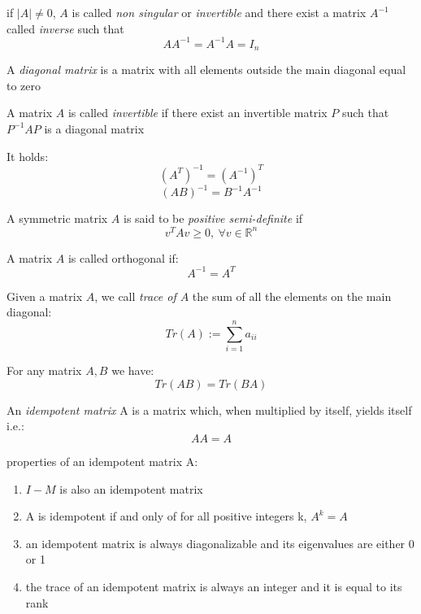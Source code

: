 \begin{defi}
if $|A| \not = 0$, $A$ is called \textit{non singular} or \textit{invertible} and there exist a matrix $A^{-1}$ called \textit{inverse} such that 
$$AA^{-1}=A^{-1}A=I_n$$
\end{defi}

\begin{defi}
	A \textit{diagonal matrix} is a matrix with all elements outside the main diagonal equal to zero
\end{defi}

\begin{defi}
	A matrix $A$ is called \textit{invertible} if there exist an invertible matrix $P$ such that $P^{-1}AP$ is a diagonal matrix
\end{defi}
\begin{prop}
It holds:
$$(A^T)^{-1}=(A^{-1})^T$$
$$(AB)^{-1}=B^{-1}A^{-1}$$
\end{prop}


\begin{defi}
A symmetric matrix $A$ is said to be \textit{positive semi-definite} if 
$$v^TAv \geq0, \ \forall v\in \mathbb{R}^n$$
\end{defi}

\begin{defi}
A matrix $A$ is called orthogonal if:
$$A^{-1}=A^T$$
\end{defi}

\begin{defi}
Given a matrix $A$, we call \textit{trace of $A$} the sum of all the elements on the main diagonal:
$$Tr(A):= \sum_{i=1}^{n} a_{ii}$$
\end{defi}
\begin{prop}
For any matrix $A,B$ we have:
$$Tr(AB)=Tr(BA)$$
\end{prop}

\begin{defi}
An \textit{idempotent matrix} A is a matrix which, when multiplied by itself, yields itself i.e.:
$$AA=A$$
\end{defi}

\begin{prop}
	properties of an idempotent matrix A:
	\begin{enumerate}
		\item $I-M$ is also an idempotent matrix
		\item A is idempotent if and only of for all positive integers k, $A^k=A$
		\item an idempotent matrix is always diagonalizable and its eigenvalues are either 0 or 1
		\item the trace of an idempotent matrix is always an integer and it is equal to its rank
	\end{enumerate}
\end{prop}


